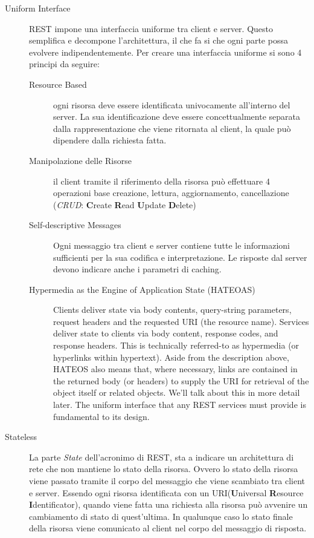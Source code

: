 \begin{description}

\item[Uniform Interface] 

REST impone una interfaccia uniforme tra client e server. Questo semplifica e decompone l'architettura, il che fa si che ogni parte possa evolvere indipendentemente. Per creare una interfaccia uniforme si sono 4 principi da seguire:

\begin{description}

\item[Resource Based] 

ogni risorsa deve essere identificata univocamente all'interno del server. La sua identificazione deve essere concettualmente separata dalla rappresentazione che viene ritornata al client, la quale può dipendere dalla richiesta fatta.

\item[Manipolazione delle Risorse] 

il client tramite il riferimento della risorsa può effettuare 4 operazioni base creazione, lettura, aggiornamento, cancellazione (\emph{CRUD}: \textbf{C}reate \textbf{R}ead \textbf{U}pdate \textbf{D}elete)

\item[Self-descriptive Messages] 

Ogni messaggio tra client e server contiene tutte le informazioni sufficienti per la sua codifica e interpretazione. Le risposte dal server devono indicare anche i parametri di caching.
\item[Hypermedia as the Engine of Application State (HATEOAS)] 
Clients deliver state via body contents, query-string parameters, request headers and the requested URI (the resource name). Services deliver state to clients via body content, response codes, and response headers. This is technically referred-to as hypermedia (or hyperlinks within hypertext).
Aside from the description above, HATEOS also means that, where necessary, links are contained in the returned body (or headers) to supply the URI for retrieval of the object itself or related objects. We'll talk about this in more detail later.
The uniform interface that any REST services must provide is fundamental to its design.

\end{description}

\item[Stateless]

La parte \emph{State} dell'acronimo di REST, sta a indicare un architettura di rete che non mantiene lo stato della risorsa. Ovvero lo stato della risorsa viene passato tramite il corpo del messaggio che viene scambiato tra client e server. Essendo ogni risorsa identificata con un URI(\textbf{U}niversal \textbf{R}esource \textbf{I}dentificator), quando viene fatta una richiesta alla risorsa può avvenire un cambiamento di stato di quest'ultima. In qualunque caso lo stato finale della risorsa viene comunicato al client nel corpo del messaggio di risposta.


\end{description}
